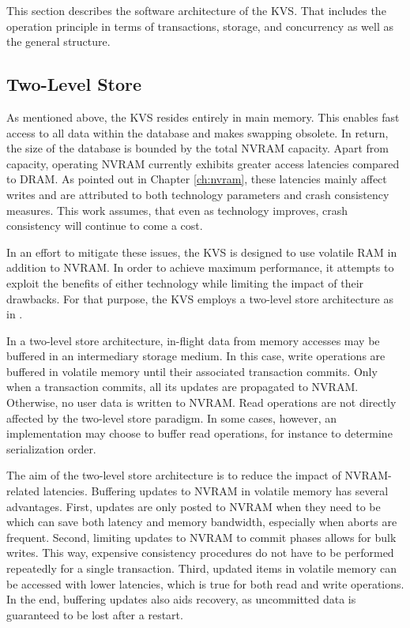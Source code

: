 This section describes the software architecture of the \ac{KVS}. That includes
the operation principle in terms of transactions, storage, and concurrency as
well as the general structure.

\subsection{Two-Level Store}

As mentioned above, the \ac{KVS} resides entirely in main memory. This enables
fast access to all data within the database and makes swapping obsolete. In
return, the size of the database is bounded by the total \ac{NVRAM} capacity.
Apart from capacity, operating \ac{NVRAM} currently exhibits greater access
latencies compared to \ac{DRAM}. As pointed out in Chapter \ref{ch:nvram}, these
latencies mainly affect writes and are attributed to both technology parameters
and crash consistency measures. This work assumes, that even as technology
improves, crash consistency will continue to come a cost.

In an effort to mitigate these issues, the \ac{KVS} is designed to use volatile
\ac{RAM} in addition to \ac{NVRAM}. In order to achieve maximum performance, it
attempts to exploit the benefits of either technology while limiting the impact
of their drawbacks. For that purpose, the \ac{KVS} employs a two-level store
architecture as in \cite{bailey2013exploring}.

In a two-level store architecture, in-flight data from memory accesses may be
buffered in an intermediary storage medium. In this case, write operations are
buffered in volatile memory until their associated transaction commits. Only
when a transaction commits, all its updates are propagated to \ac{NVRAM}.
Otherwise, no user data is written to \ac{NVRAM}. Read operations are not
directly affected by the two-level store paradigm. In some cases, however, an
implementation may choose to buffer read operations, for instance to determine
serialization order.

The aim of the two-level store architecture is to reduce the impact of
\ac{NVRAM}-related latencies. Buffering updates to \ac{NVRAM} in volatile memory
has several advantages. First, updates are only posted to \ac{NVRAM} when they
need to be which can save both latency and memory bandwidth, especially when
aborts are frequent. Second, limiting updates to \ac{NVRAM} to commit phases
allows for bulk writes. This way, expensive consistency procedures do not have
to be performed repeatedly for a single transaction. Third, updated items in
volatile memory can be accessed with lower latencies, which is true for both
read and write operations. In the end, buffering updates also aids recovery, as
uncommitted data is guaranteed to be lost after a restart.

